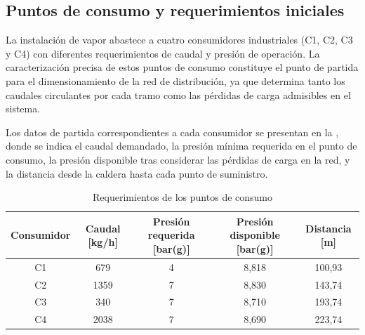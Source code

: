 
\subsection{Puntos de consumo y requerimientos iniciales}
\label{subsec:puntos-consumo-requerimientos}

La instalación de vapor abastece a cuatro consumidores industriales (C1, C2, C3 y C4) con diferentes requerimientos de caudal y presión de operación. La caracterización precisa de estos puntos de consumo constituye el punto de partida para el dimensionamiento de la red de distribución, ya que determina tanto los caudales circulantes por cada tramo como las pérdidas de carga admisibles en el sistema.

Los datos de partida correspondientes a cada consumidor se presentan en la , donde se indica el caudal demandado, la presión mínima requerida en el punto de consumo, la presión disponible tras considerar las pérdidas de carga en la red, y la distancia desde la caldera hasta cada punto de suministro.

\begin{table}[H]
	\centering
	\caption{Requerimientos de los puntos de consumo}
	\label{tab:consumidores-requerimientos}
	\begin{tabular}{ccccc}
		\toprule
		\textbf{Consumidor} & \textbf{Caudal [kg/h]} & \textbf{Presión requerida [bar(g)]} & \textbf{Presión disponible [bar(g)]} & \textbf{Distancia [m]} \\
		\midrule
		C1                  & 679                    & 4                                   & 8,818                                & 100,93                 \\
		C2                  & 1359                   & 7                                   & 8,830                                & 143,74                 \\
		C3                  & 340                    & 7                                   & 8,710                                & 193,74                 \\
		C4                  & 2038                   & 7                                   & 8,690                                & 223,74                 \\
		\bottomrule
	\end{tabular}
\end{table}

